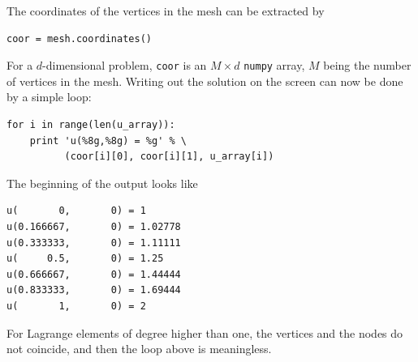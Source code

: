 The coordinates of the vertices in the mesh can be extracted
by
\begin{Verbatim}[fontsize=\fontsize{10pt}{10pt},tabsize=8,baselinestretch=1.05,
fontfamily=tt,xleftmargin=7mm]
coor = mesh.coordinates()
\end{Verbatim}
\noindent
For a $d$-dimensional problem, {\fontsize{12pt}{12pt}\verb!coor!} is an $M\times d$
{\fontsize{12pt}{12pt}\texttt{numpy}} array,
$M$ being the number of vertices in the mesh. Writing out the solution
on the screen can now be done by a simple loop:
\begin{Verbatim}[fontsize=\fontsize{10pt}{10pt},tabsize=8,baselinestretch=1.05,
fontfamily=tt,xleftmargin=7mm]
for i in range(len(u_array)):
    print 'u(%8g,%8g) = %g' % \
          (coor[i][0], coor[i][1], u_array[i])
\end{Verbatim}
\noindent
The beginning of the output looks like
\begin{Verbatim}[fontsize=\fontsize{10pt}{10pt},tabsize=8,baselinestretch=1.05,
fontfamily=tt,xleftmargin=7mm]
u(       0,       0) = 1
u(0.166667,       0) = 1.02778
u(0.333333,       0) = 1.11111
u(     0.5,       0) = 1.25
u(0.666667,       0) = 1.44444
u(0.833333,       0) = 1.69444
u(       1,       0) = 2
\end{Verbatim}
\noindent
For Lagrange elements of
degree higher than one,
the vertices and the nodes do not coincide, and then
the loop above is meaningless.

